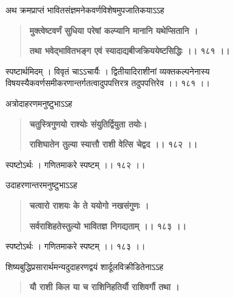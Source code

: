 \documentclass[11pt, openany]{book}
\begin{document}
\begin{sloppypar}
\hangindent=0.2in \hspace{0.2in}अथ क्रमप्राप्तं भावितसंज्ञमनेकवर्णविशेषमुपजातिकयाऽऽह\textendash

\begin{quote}
\hspace{0.5in}\textbf{मुक्त्वेष्टवर्णं सुधिया परेषां कल्प्यानि मानानि यथेप्सितानि ।}

\hspace{0.5in}\textbf{तथा भवेद्भावितभङ्ग एवं स्यादाद्यबीजक्रिययेष्टसिद्धिः ।। १८१ ।।}
\end{quote}

\hangindent=0.2in \hspace{0.2in}स्पष्टार्थमिदम् । विवृतं चाऽऽचार्यैः । द्वितीयादिराशीनां व्यक्तकल्पनेनास्य विषयस्यैकवर्णसमीकरणान्तर्गतत्वादुपपत्तिरत्र तदुपपत्तिरेव ।। १८१ ।। 

\hangindent=0.2in \hspace{0.2in}अत्रोदाहरणमनुष्टुभाऽऽह\textendash

\begin{quote}
\hspace{1in}\textbf{चतुस्त्रिगुणयो राश्योः संयुतिर्द्वियुता तयोः।}

\hspace{1in}\textbf{राशिघातेन तुल्या स्यात्तौ राशी वेत्सि चेद्वद ।। १८२ ।।}
\end{quote}

\hangindent=0.2in \hspace{0.2in}स्पष्टोऽर्थः । गणितमाकरे स्पष्टम् ।। १८२ ।। 

\hangindent=0.2in \hspace{0.2in}उदाहरणान्तरमनुष्टुभाऽऽह\textendash

\begin{quote}
\hspace{1in}\textbf{चत्वारो राशयः के ते ययोगो नखसंगुणः ।}

\hspace{1in}\textbf{सर्वराशिहतेस्तुल्यो भावितज्ञ निगद्यताम् ।। १८३ ।।}
\end{quote}

\hangindent=0.2in \hspace{0.2in}स्पष्टोऽर्थः । गणितमाकरे स्पष्टम् ।। १८३ ।। 

\hangindent=0.2in \hspace{0.2in}शिष्यबुद्धिप्रसारार्थमन्यदुदाहरणद्वयं शार्दूलविक्रीडितेनाऽऽह\textendash

\begin{quote}
\hspace{1in}\textbf{यौ राशी किल या च राशिनिहतिर्यौ राशिवर्गौ तथा ।}


\end{quote}
\end{sloppypar}
\end{document}
